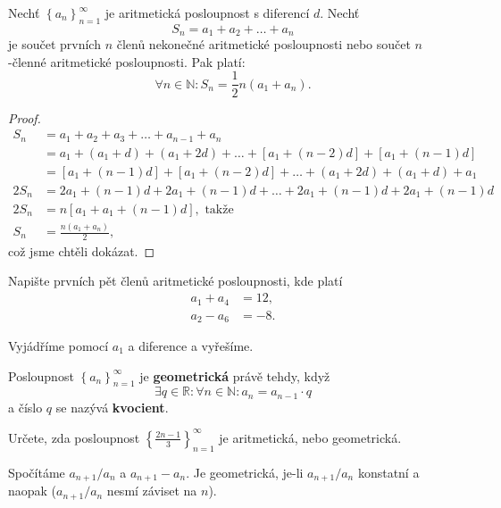 \begin{veta}
Nechť $\left \{ a_n \right \}_{n=1}^\infty $ je aritmetická posloupnost s diferencí
$d$. Nechť
$$S_n=a_1+a_2+\dots+a_n$$
je součet prvních $n$ členů nekonečné aritmetické posloupnosti nebo součet
$n$-členné aritmetické posloupnosti. Pak platí:
$$\forall n \in \mathbb N:S_n = \frac{1}{2}n(a_1+a_n).$$
\end{veta}

\begin{proof}
\begin{align*}
    S_n &= a_1+a_2+a_3+\dots+a_{n-1}+a_n \\
    &= a_1 + (a_1+d)+ (a_1+2d)+ \dots + [a_1+(n-2)d]+[a_1+(n-1)d]\\
    &= [a_1+(n-1)d]+[a_1+(n-2)d]+\dots+(a_1+2d)+(a_1+d)+a_1\\
    2S_n &= 2a_1 + (n-1)d + 2a_1 + (n-1)d + \dots + 2a_1 + (n-1)d + 2a_1 + (n-1)d\\
    2S_n &= n [a_1 + a_1 + (n-1)d], \textrm{ takže }\\
    S_n &= \frac{n(a_1+a_n)}{2},
\end{align*}
což jsme chtěli dokázat. \qedhere
\end{proof}

\begin{priklad}
Napište prvních pět členů aritmetické posloupnosti, kde platí
\begin{align*}
    a_1+a_4&=12,\\
    a_2-a_6&=-8.
\end{align*}
\end{priklad}

\begin{reseni}
Vyjádříme pomocí $a_1$ a diference a vyřešíme.
\end{reseni}

\begin{definition}
Posloupnost $\left \{ a_n \right \}_{n=1}^\infty $ je \textbf{geometrická} právě
tehdy, když
$$\exists q \in \mathbb R: \forall n \in \mathbb N: a_n=a_{n-1}\cdot q$$
a číslo $q$ se nazývá \textbf{kvocient}.
\end{definition}

\begin{priklad}
Určete, zda posloupnost $\left \{ \frac{2n-1}{3} \right \}_{n=1}^\infty $ je aritmetická, nebo geometrická.
\end{priklad}

\begin{reseni}
Spočítáme $a_{n+1}/a_n$ a $a_{n+1}-a_n$. Je geometrická, je-li $a_{n+1}/a_n$ konstatní a naopak ($a_{n+1}/a_n$ nesmí záviset na $n$).
\end{reseni}

